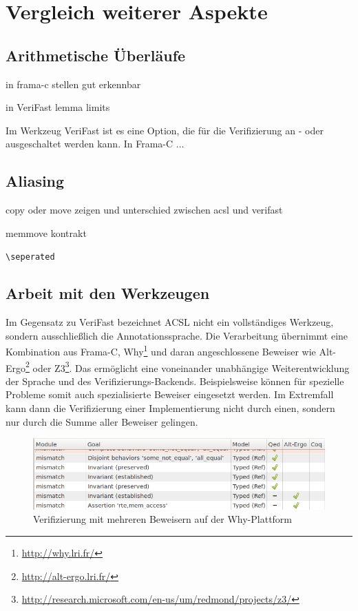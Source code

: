 ﻿\chapter{Vergleich weiterer Aspekte}


\section{Arithmetische Überläufe}
\label{sec:implementation:overflows}

in frama-c stellen gut erkennbar

in VeriFast lemma limits

 Im Werkzeug VeriFast
ist es eine Option, die für die Verifizierung an - oder ausgeschaltet werden kann. In Frama-C ... 

\section{Aliasing}

copy oder move zeigen und unterschied zwischen acsl und verifast

memmove kontrakt

\lstinline{\seperated}



\section{Arbeit mit den Werkzeugen}
Im Gegensatz zu VeriFast bezeichnet ACSL nicht ein vollständiges Werkzeug, sondern ausschließlich
die Annotationssprache. Die Verarbeitung übernimmt eine Kombination aus Frama-C, Why\footnote{
\url{http://why.lri.fr/}} und daran angeschlossene Beweiser wie Alt-Ergo\footnote{\url{http://alt-ergo.lri.fr/}}
oder Z3\footnote{\url{http://research.microsoft.com/en-us/um/redmond/projects/z3/}}. Das ermöglicht 
eine voneinander unabhängige Weiterentwicklung der Sprache und des Verifizierungs-Backends. Beispielsweise 
können für spezielle Probleme somit auch spezialisierte Beweiser eingesetzt werden. Im Extremfall kann
dann die Verifizierung einer Implementierung nicht durch einen, sondern nur durch die Summe aller
Beweiser gelingen.

\begin{figure}[H]
	\centering
\includegraphics[width=1.0\textwidth]{images/why-multiple-provers.png}
\caption{Verifizierung mit mehreren Beweisern auf der Why-Plattform}
\end{figure}

